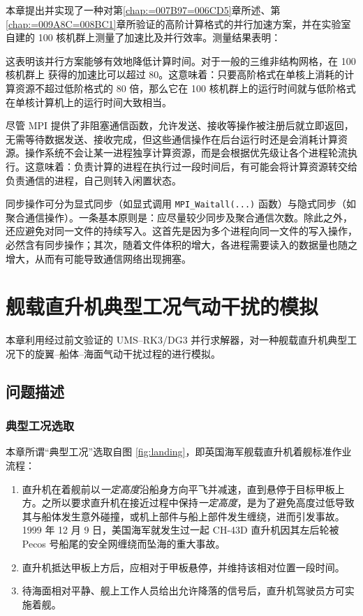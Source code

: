 本章提出并实现了一种对第\ref{chap:=007B97=006CD5}章所述、第\ref{chap:=009A8C=008BC1}章所验证的高阶计算格式的并行加速方案，并在实验室自建的
100 核机群上测量了加速比及并行效率。测量结果表明：
\begin{description}[wide]
\item [{加速比近似随分块/进程/核心数量线性增长}] 这表明该并行方案能够有效地降低计算时间。对于一般的三维非结构网格，在 100 核机群上
获得的加速比可以超过 80。这意味着：只要高阶格式在单核上消耗的计算资源不超过低阶格式的 80 倍，那么它在 100 核机群上的运行时间就与低阶格式在单核计算机上的运行时间大致相当。
\item [{“通信与计算重叠”的假设过于理想}] 尽管 MPI 提供了非阻塞通信函数，允许发送、接收等操作被注册后就立即返回，无需等待数据发送、接收完成，但这些通信操作在后台运行时还是会消耗计算资源。操作系统不会让某一进程独享计算资源，而是会根据优先级让各个进程轮流执行。这意味着：负责计算的进程在执行过一段时间后，有可能会将计算资源转交给负责通信的进程，自己则转入闲置状态。
\item [{同步操作对并行性能有负面影响}] 同步操作可分为显式同步（如显式调用 \texttt{MPI\_Waitall(...)} 函数）与隐式同步（如聚合通信操作）。一条基本原则是：应尽量较少同步及聚合通信次数。除此之外，还应避免对同一文件的持续写入。这首先是因为多个进程向同一文件的写入操作，必然含有同步操作；其次，随着文件体积的增大，各进程需要读入的数据量也随之增大，从而有可能导致通信网络出现拥塞。
\end{description}


\chapter{舰载直升机典型工况气动干扰的模拟\label{chap:=005E94=007528}}

本章利用经过前文验证的 UMS–RK3/DG3 并行求解器，对一种舰载直升机典型工况下的旋翼–船体–海面气动干扰过程的进行模拟。

\section{问题描述}

\subsection{典型工况选取}

本章所谓“典型工况”选取自图 \ref{fig:landing}，即英国海军舰载直升机着舰标准作业流程：
\begin{enumerate}[wide]
\item 直升机在着舰前以\emph{一定高度}沿船身方向平飞并减速，直到悬停于目标甲板上方。之所以要求直升机在接近过程中保持\emph{一定高度}，是为了避免高度过低导致其与船体发生意外碰撞，或机上部件与船上部件发生缠绕，进而引发事故。1999
年 12 月 9 日，美国海军就发生过一起 CH-43D 直升机因其左后轮被 Pecos 号船尾的安全网缠绕而坠海的重大事故。
\item 直升机抵达甲板上方后，应相对于甲板悬停，并维持该相对位置一段时间。
\item 待海面相对平静、舰上工作人员给出允许降落的信号后，直升机驾驶员方可实施着舰。
\end{enumerate}

